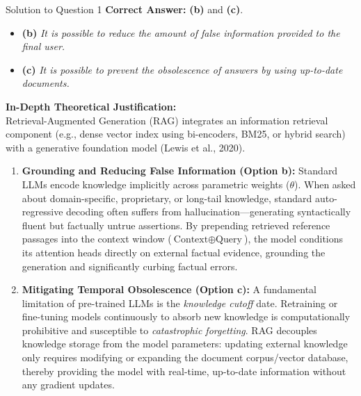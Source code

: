 \documentclass[11pt,a4paper]{article}
\begin{document}
\begin{solutionbox}{Solution to Question 1}
\textbf{Correct Answer:} \textbf{(b)} and \textbf{(c)}.
\begin{itemize}
    \item \textbf{(b)} \textit{It is possible to reduce the amount of false information provided to the final user.}
    \item \textbf{(c)} \textit{It is possible to prevent the obsolescence of answers by using up-to-date documents.}
\end{itemize}

\medskip
\textbf{In-Depth Theoretical Justification:}\\
Retrieval-Augmented Generation (RAG) integrates an information retrieval component (e.g., dense vector index using bi-encoders, BM25, or hybrid search) with a generative foundation model (Lewis et al., 2020). 
\begin{enumerate}[label=\textbf{\arabic*.}]
    \item \textbf{Grounding and Reducing False Information (Option b):} Standard LLMs encode knowledge implicitly across parametric weights ($\theta$). When asked about domain-specific, proprietary, or long-tail knowledge, standard auto-regressive decoding often suffers from hallucination---generating syntactically fluent but factually untrue assertions. By prepending retrieved reference passages into the context window ($\text{Context} \oplus \text{Query}$), the model conditions its attention heads directly on external factual evidence, grounding the generation and significantly curbing factual errors.
    \item \textbf{Mitigating Temporal Obsolescence (Option c):} A fundamental limitation of pre-trained LLMs is the \textit{knowledge cutoff} date. Retraining or fine-tuning models continuously to absorb new knowledge is computationally prohibitive and susceptible to \textit{catastrophic forgetting}. RAG decouples knowledge storage from the model parameters: updating external knowledge only requires modifying or expanding the document corpus/vector database, thereby providing the model with real-time, up-to-date information without any gradient updates.
\end{enumerate}


\end{solutionbox}
\end{document}
